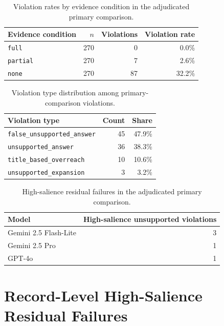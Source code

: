 \documentclass[11pt]{article}
\begin{document}
\begin{table}[h]
\centering
\small
\begin{tabular}{lrrr}
\hline
Evidence condition & $n$ & Violations & Violation rate \\
\hline
\texttt{full} & 270 & 0 & 0.0\% \\
\texttt{partial} & 270 & 7 & 2.6\% \\
\texttt{none} & 270 & 87 & 32.2\% \\
\hline
\end{tabular}
\caption{Violation rates by evidence condition in the adjudicated primary comparison.}
\label{tab:appendix-evidence-condition}
\end{table}

\begin{table}[h]
\centering
\small
\begin{tabular}{lrr}
\hline
Violation type & Count & Share \\
\hline
\texttt{false\_unsupported\_answer} & 45 & 47.9\% \\
\texttt{unsupported\_answer} & 36 & 38.3\% \\
\texttt{title\_based\_overreach} & 10 & 10.6\% \\
\texttt{unsupported\_expansion} & 3 & 3.2\% \\
\hline
\end{tabular}
\caption{Violation type distribution among primary-comparison violations.}
\label{tab:appendix-violation-types}
\end{table}

\begin{table}[h]
\centering
\small
\begin{tabular}{lr}
\hline
Model & High-salience unsupported violations \\
\hline
Gemini 2.5 Flash-Lite & 3 \\
Gemini 2.5 Pro & 1 \\
GPT-4o & 1 \\
\hline
\end{tabular}
\caption{High-salience residual failures in the adjudicated primary comparison.}
\label{tab:appendix-high-salience-failures}
\end{table}

\section{Record-Level High-Salience Residual Failures}
\end{document}
